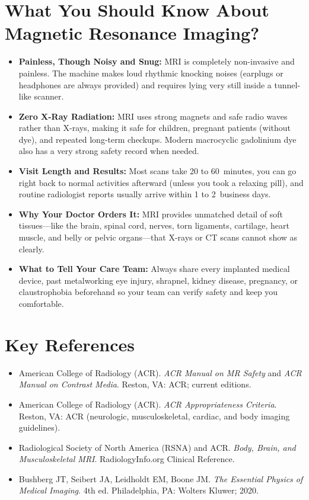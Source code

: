 \section{What You Should Know About Magnetic Resonance Imaging?}
\begin{itemize}
\item \textbf{Painless, Though Noisy and Snug:} MRI is completely non-invasive and painless. The machine makes loud rhythmic knocking noises (earplugs or headphones are always provided) and requires lying very still inside a tunnel-like scanner.
\item \textbf{Zero X-Ray Radiation:} MRI uses strong magnets and safe radio waves rather than X-rays, making it safe for children, pregnant patients (without dye), and repeated long-term checkups. Modern macrocyclic gadolinium dye also has a very strong safety record when needed.
\item \textbf{Visit Length and Results:} Most scans take 20 to 60~minutes, you can go right back to normal activities afterward (unless you took a relaxing pill), and routine radiologist reports usually arrive within 1 to 2~business days.
\item \textbf{Why Your Doctor Orders It:} MRI provides unmatched detail of soft tissues---like the brain, spinal cord, nerves, torn ligaments, cartilage, heart muscle, and belly or pelvic organs---that X-rays or CT scans cannot show as clearly.
\item \textbf{What to Tell Your Care Team:} Always share every implanted medical device, past metalworking eye injury, shrapnel, kidney disease, pregnancy, or claustrophobia beforehand so your team can verify safety and keep you comfortable.
\end{itemize}

\section{Key References}
\begin{itemize}
\item American College of Radiology (ACR). \textit{ACR Manual on MR Safety} and \textit{ACR Manual on Contrast Media}. Reston, VA: ACR; current editions.
\item American College of Radiology (ACR). \textit{ACR Appropriateness Criteria}. Reston, VA: ACR (neurologic, musculoskeletal, cardiac, and body imaging guidelines).
\item Radiological Society of North America (RSNA) and ACR. \textit{Body, Brain, and Musculoskeletal MRI}. RadiologyInfo.org Clinical Reference.
\item Bushberg JT, Seibert JA, Leidholdt EM, Boone JM. \textit{The Essential Physics of Medical Imaging}. 4th ed. Philadelphia, PA: Wolters Kluwer; 2020.
\end{itemize}

